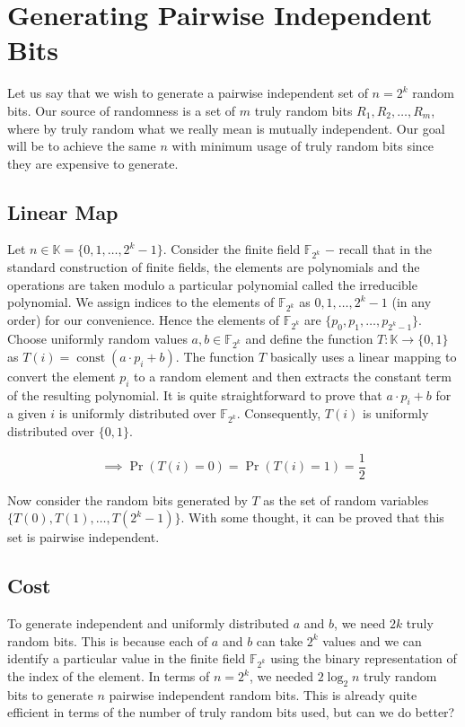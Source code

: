 \section{Generating Pairwise Independent Bits}

Let us say that we wish to generate a pairwise independent set of $n=2^k$ random bits. Our source of randomness 
is a set of $m$ truly random bits $R_1,R_2,\dots,R_m$, where by truly random what we really 
mean is mutually independent. Our goal will be to achieve the same $n$ with minimum usage of truly 
random bits since they are expensive to generate.

\subsection{Linear Map}

Let $n \in \mathbb K=\{0,1,\dots,2^k-1\}$. Consider the finite field $\mathbb F_{2^k}$ $-$ recall that in the 
standard construction of finite fields, the elements are polynomials and the operations are taken modulo a 
particular polynomial called the irreducible polynomial. We assign indices to the elements of $\mathbb F_{2^k}$ as 
$0,1,\dots,2^k-1$ (in any order) for our convenience. Hence the elements of $\mathbb F_{2^k}$ are 
$\{p_0,p_1,\dots,p_{2^k-1}\}$.\\ 

\noindent Choose uniformly random values $a,b \in \mathbb F_{2^k}$ and define the function 
$T : \mathbb K \to \{0,1\}$ as $T(i) = \operatorname{const}(a\cdot p_i+ b)$. The function $T$ basically 
uses a linear mapping to convert the element $p_i$ to a random element and then extracts the 
constant term of the resulting polynomial. It is quite straightforward to prove that $a\cdot p_i+b$ for a 
given $i$ is uniformly distributed over $\mathbb F_{2^k}$. Consequently, $T(i)$ is uniformly distributed over 
$\{0,1\}$.

\[
\implies \Pr(T(i)=0)=\Pr(T(i)=1)=\frac12
\]

\noindent Now consider the random bits generated by $T$ as the set of random variables 
$\{T(0),T(1),\dots,T(2^k-1)\}$. With some thought, it can be proved that this set is pairwise independent.

\subsection*{Cost}
To generate independent and uniformly distributed $a$ and $b$, we need $2k$ truly random bits. 
This is because each of $a$ and $b$ can take $2^k$ values and we can identify a particular value in the 
finite field $\mathbb F_{2^k}$ using the binary representation of the index of the element. In terms of $n=2^k$, 
we needed $2\log_2 n$ truly random bits to generate $n$ pairwise independent random bits. This 
is already quite efficient in terms of the number of truly random bits used, but can we do better? 

